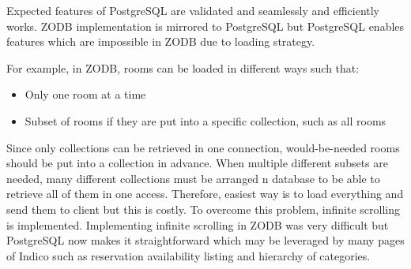Expected features of PostgreSQL are validated and seamlessly and efficiently works. ZODB implementation is mirrored to PostgreSQL but PostgreSQL enables features which are impossible in ZODB due to loading strategy. 

For example, in ZODB, rooms can be loaded in different ways such that:
\begin{itemize}
  \item Only one room at a time
  \item Subset of rooms if they are put into a specific collection, such as all rooms
\end{itemize}

Since only collections can be retrieved in one connection, would-be-needed rooms should be put into a collection in advance. When multiple different subsets are needed, many different collections must be arranged n database to be able to retrieve all of them in one access. Therefore, easiest way is to load everything and send them to client but this is costly. To overcome this problem, infinite scrolling is implemented. Implementing infinite scrolling in ZODB was very difficult but PostgreSQL now makes it straightforward which may be leveraged by many pages of Indico such as reservation availability listing and hierarchy of categories.